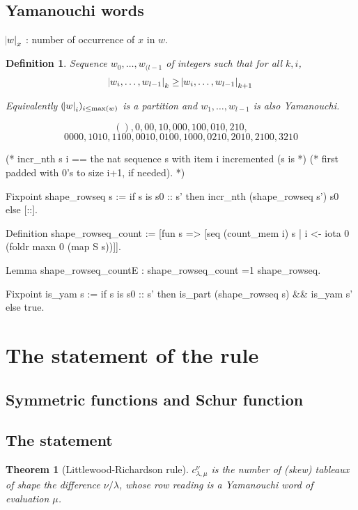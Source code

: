 \documentclass[12pt,a4paper]{article}
\newtheorem{THEO}{Theorem}
\newtheorem{DEFN}{Definition}
\begin{document}
\subsection{Yamanouchi words}

  $\abs{w}_x$ : number of occurrence of $x$ in $w$.

  \begin{DEFN}
    Sequence $w_0,\dots,w_{(l-1}$ of integers such that for all $k, i$,
    \[ \abs{w_i,\dots,w_{l-1}}_k \geq \abs{w_i,\dots,w_{l-1}}_{k+1} \]

    Equivalently $(\abs{w}_i)_{i\leq\max(w)}$ is a partition and $w_1,\dots,w_{l-1}$ is
    also Yamanouchi.
  \end{DEFN}

  \[ (), 0, 00, 10, 000, 100, 010, 210, \]
  \[ 0000, 1010, 1100, 0010, 0100, 1000, 0210, 2010, 2100, 3210 \]

  \begin{coqcode}
(* incr_nth s i == the nat sequence s with item i incremented (s is *)
(*                 first padded with 0's to size i+1, if needed).   *)

  Fixpoint shape_rowseq s :=
    if s is s0 :: s'
    then incr_nth (shape_rowseq s') s0
    else [::].

  Definition shape_rowseq_count :=
    [fun s => [seq (count_mem i) s | i <- iota 0 (foldr maxn 0 (map S s))]].

  Lemma shape_rowseq_countE : shape_rowseq_count =1 shape_rowseq.

  Fixpoint is_yam s :=
    if s is s0 :: s'
    then is_part (shape_rowseq s) && is_yam s'
    else true.
\end{coqcode} 

\section{The statement of the rule}

\subsection{Symmetric functions and Schur function}

\subsection{The statement}

\begin{THEO}[Littlewood-Richardson rule]
  $c_{\lambda, \mu}^{\nu}$ is the number of (skew) tableaux of shape the
  difference $\nu/\lambda$, whose row reading is a Yamanouchi word of
  evaluation $\mu$.
\end{THEO}
\end{document}
